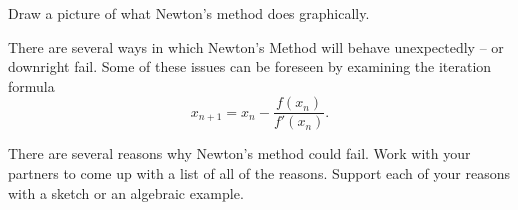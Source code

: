 \begin{problem}
    Draw a picture of what Newton's method does graphically.
\end{problem}


There are several ways in which Newton's Method will behave unexpectedly -- or downright
fail.  Some of these issues can be foreseen by examining the iteration formula 
\[ x_{n+1} = x_n - \frac{f(x_n)}{f'(x_n)}. \]
\begin{problem}\label{prob:newton_fail}
    There are several reasons why Newton's method could fail.  Work with your partners to
    come up with a list of all of the reasons.  Support each of your reasons with a
    sketch or an algebraic example.
\end{problem}

